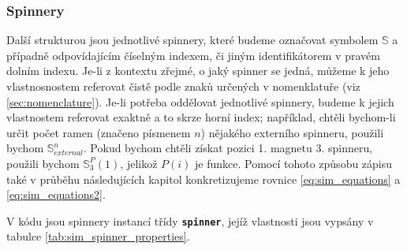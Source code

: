 \subsubsection{Spinnery}

Další strukturou jsou jednotlivé spinnery, které budeme označovat symbolem $\mathbb{S}$ a případně odpovídajícím číselným indexem, či jiným identifikátorem v pravém dolním indexu. Je-li z kontextu zřejmé, o jaký spinner se jedná, můžeme k jeho vlastnosnostem referovat čistě podle znaků určených v nomenklatuře (viz \autoref{sec:nomenclature}). Je-li potřeba oddělovat jednotlivé spinnery, budeme k jejich vlastnostem referovat exaktně a to skrze horní index; například, chtěli bychom-li určit počet ramen (značeno písmenem $n$) nějakého externího spinneru, použili bychom $\mathbb{S}_{external}^{n}$. Pokud bychom chtěli získat pozici 1. magnetu 3. spinneru, použili bychom $\mathbb{S}_{3}^{P}(1)$, jelikož $P(i)$ je funkce. Pomocí tohoto způsobu zápisu také v průběhu následujících kapitol konkretizujeme rovnice \ref{eq:sim_equations} a \ref{eq:sim_equations2}.

V kódu jsou spinnery instancí třídy \textbf{\texttt{spinner}}, jejíž vlastnosti jsou vypsány v tabulce \ref{tab:sim_spinner_properties}.

